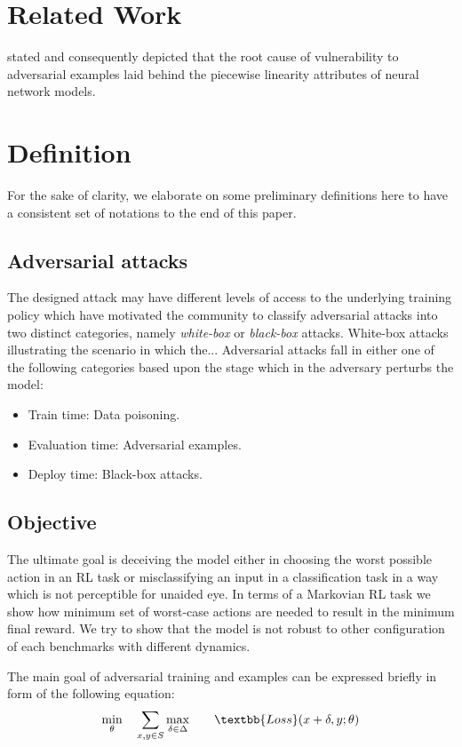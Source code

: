 \documentclass{article}
\begin{document}
\section{Related Work}
\cite{Goodfellow2014} stated and consequently depicted that the root cause of vulnerability to adversarial examples laid behind the piecewise linearity attributes of neural network models.

\section{Definition}
For the sake of clarity, we elaborate on some preliminary definitions here to have a consistent set of notations to the end of this paper.

\subsection{Adversarial attacks}
The designed attack may have different levels of access to the underlying training policy which have motivated the community to classify adversarial attacks into two distinct categories, namely \textit{white-box} or \textit{black-box} attacks. White-box attacks illustrating the scenario in which the... Adversarial attacks fall in either one of the following categories based upon the stage which in the adversary perturbs the model:
\begin{itemize}
    \item Train time: Data poisoning.
    \item Evaluation time: Adversarial examples.
    \item Deploy time: Black-box attacks.
\end{itemize}


\subsection{Objective}
The ultimate goal is deceiving the model either in choosing the worst possible action in an RL task or misclassifying an input in a classification task in a way which is not perceptible for unaided eye. In terms of a Markovian RL task we show how minimum set of worst-case actions are needed to result in the minimum final reward. We try to show that the model is not robust to other configuration of each benchmarks with different dynamics.

The main goal of adversarial training and examples can be expressed briefly in form of the following equation:
\begin{equation}
\begin{aligned}
& \underset{\theta}{\min}
& & \sum_{x,y \in S} \underset{\delta \in \Delta}{\max}
& & & \textbb{Loss}(x + \delta, y; \theta)
\end{aligned}
\end{equation}
\end{document}
